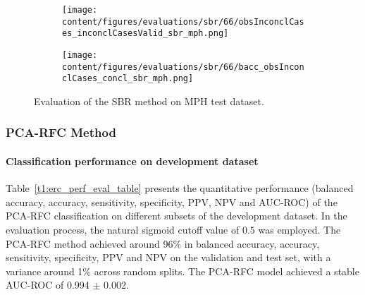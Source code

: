 \begin{figure}[ht]
  \begin{subfigure}{0.49\textwidth}
    \centering
    \texttt{[image: content/figures/evaluations/sbr/66/obsInconclCases\_inconclCasesValid\_sbr\_mph.png]}
    \label{fig:obsInconclCases_inconclCasesValid_sbr_mph}
  \end{subfigure}
  \hfill
  \begin{subfigure}{0.49\textwidth}
    \centering
    \texttt{[image: content/figures/evaluations/sbr/66/bacc\_obsInconclCases\_concl\_sbr\_mph.png]}
    \label{fig:bacc_obsInconclCases_concl_sbr_mph}
  \end{subfigure}
  \caption{Evaluation of the SBR method on MPH test dataset.}
  \label{fig:perf_results_sbr_mph}
\end{figure}




\subsubsection{PCA-RFC Method}
\label{subsubsec:eval_rfc}


\paragraph{Classification performance on development dataset}

Table~\ref{t1:erc_perf_eval_table} presents the quantitative performance 
(balanced accuracy, accuracy, sensitivity, specificity, PPV, NPV and AUC-ROC) of the PCA-RFC classification on 
different subsets of the development dataset.
In the evaluation process, the natural sigmoid cutoff value of $0.5$ was employed.
The PCA-RFC method achieved around 96\% in balanced accuracy, accuracy, sensitivity, specificity, PPV and NPV 
on the validation and test set, with a variance around 1\% across random splits.
The PCA-RFC model achieved a stable AUC-ROC of 0.994 $\pm$ 0.002.


